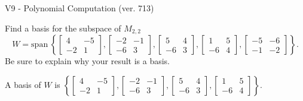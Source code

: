 \begin{exercise}
  \begin{exerciseTitle}V9 - Polynomial Computation (ver. 713)\end{exerciseTitle}
  \begin{exerciseStatement}
    Find a basis for the subspace of \(M_{2,2}\) 
\[W=\mathrm{span}\ \left\{\left[\begin{array}{cc}
4 & -5 \\
-2 & 1
\end{array}\right] , \left[\begin{array}{cc}
-2 & -1 \\
-6 & 3
\end{array}\right] , \left[\begin{array}{cc}
5 & 4 \\
-6 & 3
\end{array}\right] , \left[\begin{array}{cc}
1 & 5 \\
-6 & 4
\end{array}\right] , \left[\begin{array}{cc}
-5 & -6 \\
-1 & -2
\end{array}\right]\right\}.\]
 Be sure to explain why your result is a basis.


  \end{exerciseStatement}
  \begin{exerciseAnswer}
   A basis of \(W\) is  \(\left\{\left[\begin{array}{cc}
4 & -5 \\
-2 & 1
\end{array}\right] , \left[\begin{array}{cc}
-2 & -1 \\
-6 & 3
\end{array}\right] , \left[\begin{array}{cc}
5 & 4 \\
-6 & 3
\end{array}\right] , \left[\begin{array}{cc}
1 & 5 \\
-6 & 4
\end{array}\right]\right\}\).
  


  \end{exerciseAnswer}
\end{exercise}